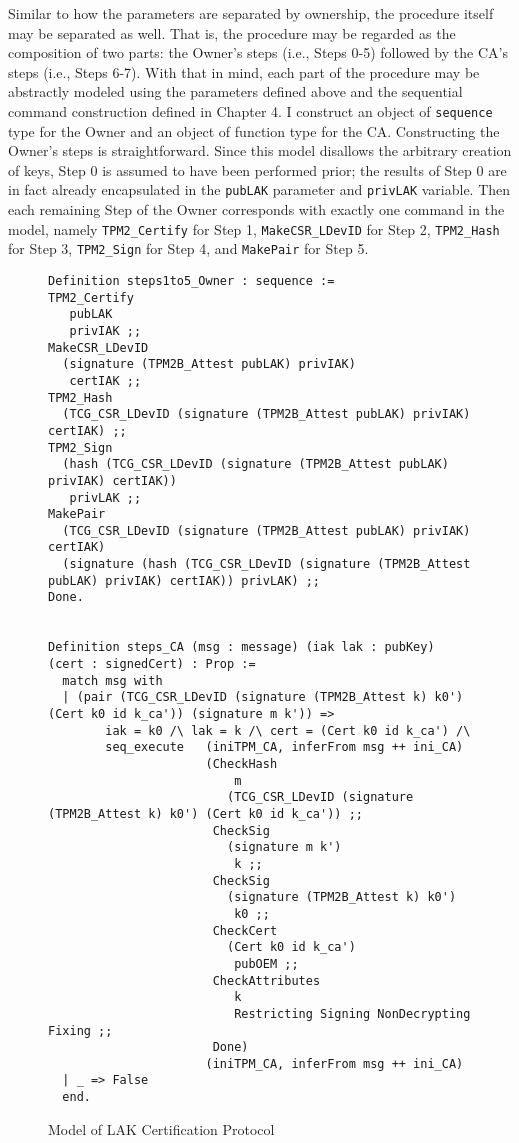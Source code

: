  Similar to how the parameters are separated by ownership, the procedure itself may be separated as well. That is, the procedure may be regarded as the composition of two parts: the Owner's steps (i.e., Steps 0-5) followed by the CA's steps (i.e., Steps 6-7).
 With that in mind, each part of the procedure may be abstractly modeled using the parameters defined above and the sequential command construction defined in Chapter 4. I construct an object of \verb|sequence| type for the Owner and an object of function type for the CA. Constructing the Owner's steps is straightforward. Since this model disallows the arbitrary creation of keys, Step 0 is assumed to have been performed prior; the results of Step 0 are in fact already encapsulated in the \verb|pubLAK| parameter and \verb|privLAK| variable. Then each remaining Step of the Owner corresponds with exactly one command in the model, namely \verb|TPM2_Certify| for Step 1, \verb|MakeCSR_LDevID| for Step 2, \verb|TPM2_Hash| for Step 3, \verb|TPM2_Sign| for Step 4, and \verb|MakePair| for Step 5. 
\begin{figure}[h!]
\begin{lstlisting}[language=Coq]
Definition steps1to5_Owner : sequence :=
TPM2_Certify 
   pubLAK 
   privIAK ;;
MakeCSR_LDevID 
  (signature (TPM2B_Attest pubLAK) privIAK) 
   certIAK ;;
TPM2_Hash 
  (TCG_CSR_LDevID (signature (TPM2B_Attest pubLAK) privIAK) certIAK) ;;
TPM2_Sign 
  (hash (TCG_CSR_LDevID (signature (TPM2B_Attest pubLAK) privIAK) certIAK)) 
   privLAK ;;
MakePair 
  (TCG_CSR_LDevID (signature (TPM2B_Attest pubLAK) privIAK) certIAK) 
  (signature (hash (TCG_CSR_LDevID (signature (TPM2B_Attest pubLAK) privIAK) certIAK)) privLAK) ;;
Done. 


Definition steps_CA (msg : message) (iak lak : pubKey) (cert : signedCert) : Prop :=
  match msg with
  | (pair (TCG_CSR_LDevID (signature (TPM2B_Attest k) k0') (Cert k0 id k_ca')) (signature m k')) =>
        iak = k0 /\ lak = k /\ cert = (Cert k0 id k_ca') /\
        seq_execute   (iniTPM_CA, inferFrom msg ++ ini_CA)
                      (CheckHash 
                          m
                         (TCG_CSR_LDevID (signature (TPM2B_Attest k) k0') (Cert k0 id k_ca')) ;;
                       CheckSig
                         (signature m k') 
                          k ;;
                       CheckSig 
                         (signature (TPM2B_Attest k) k0') 
                          k0 ;;
                       CheckCert 
                         (Cert k0 id k_ca') 
                          pubOEM ;;
                       CheckAttributes 
                          k 
                          Restricting Signing NonDecrypting Fixing ;;
                       Done)
                      (iniTPM_CA, inferFrom msg ++ ini_CA)
  | _ => False
  end.
\end{lstlisting}
\caption{Model of LAK Certification Protocol}
\label{fig:lak_model}
\end{figure}

